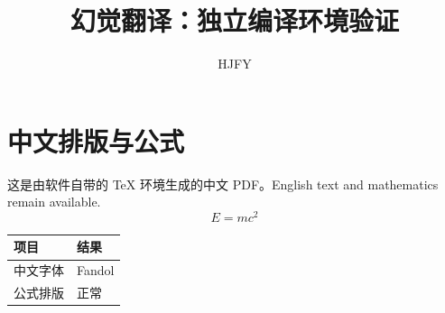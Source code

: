 \documentclass{article}
\title{幻觉翻译：独立编译环境验证}
\author{HJFY}
\date{}
\begin{document}
\maketitle
\section{中文排版与公式}
这是由软件自带的 TeX 环境生成的中文 PDF。English text and mathematics remain available.
\begin{equation}E=mc^2\end{equation}
\begin{tabular}{ll}\toprule 项目 & 结果\\\midrule 中文字体 & Fandol\\公式排版 & 正常\\\bottomrule\end{tabular}
\end{document}
